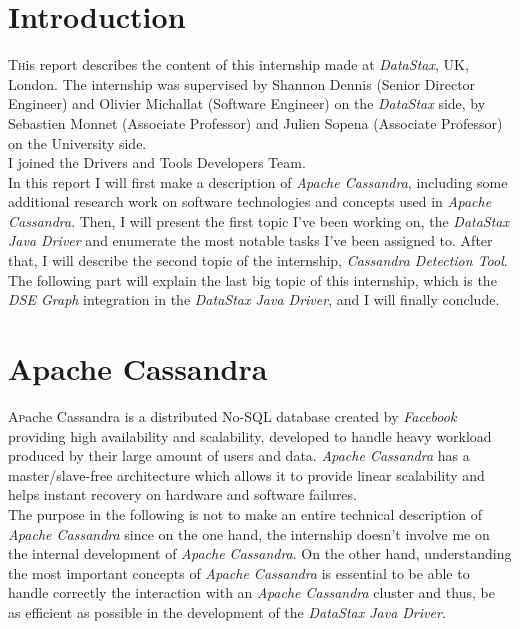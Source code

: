 \documentclass[a4paper]{report}
\newcommand\blankpage{%
    \null
    \thispagestyle{empty}%
    \addtocounter{page}{-1}%
    \newpage}
\newcommand{\ds}{\emph{DataStax\xspace}}
\newcommand{\djd}{\emph{DataStax Java Driver\xspace}}
\newcommand{\ca}{\emph{Apache Cassandra\xspace}}
\newcommand{\cdt}{\emph{Cassandra Detection Tool\xspace}}
\begin{document}
\afterpage{\blankpage}

\tableofcontents
\afterpage{\blankpage}



\chapter{Introduction}

\pagestyle{plain}
\lettrine[nindent=0em,lines=3]{T} his report describes the content of this internship made at \ds{}, UK, London. The internship was supervised by Shannon Dennis (Senior Director Engineer) and Olivier Michallat (Software Engineer) on the \ds{} side, by Sebastien Monnet (Associate Professor) and Julien Sopena (Associate Professor) on the University side.\\
I joined the Drivers and Tools Developers Team. \\
In this report I will first make a description of \ca{}, including some additional research work on software technologies and concepts used in \ca{}. Then, I will present the first topic I've been working on, the \djd{} and enumerate the most notable tasks I've been assigned to. After that, I will describe the second topic of the internship, \cdt{}. The following part will explain the last big topic of this internship, which is the \emph{DSE Graph} integration in the \djd{}, and I will finally conclude.

\chapter{Apache Cassandra}
\lettrine[nindent=0em,lines=3]{A} pache Cassandra is a distributed No-SQL database created by \emph{Facebook} providing high availability and scalability, developed to handle heavy workload produced by their large amount of users and data. \ca{} has a master/slave-free architecture which allows it to provide linear scalability and helps instant recovery on hardware and software failures.\\
The purpose in the following is not to make an entire technical description of \ca{} since on the one hand, the internship doesn't involve me on the internal development of \ca{}. On the other hand, understanding the most important concepts of \ca{} is essential to be able to handle correctly the interaction with an \ca{} cluster and thus, be as efficient as possible in the development of the \djd{}.
\end{document}
